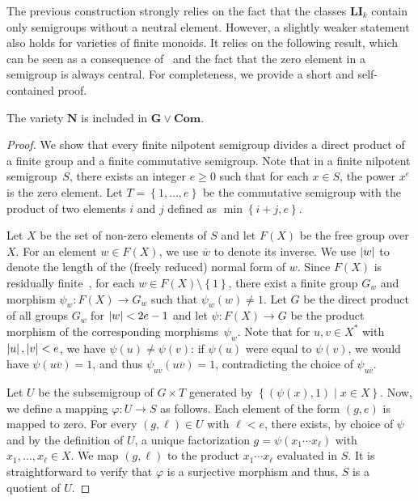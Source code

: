 \documentclass{toc}
\renewcommand{\geq}{\geqslant}
\renewcommand{\ge}{\geq}
\newcommand{\abs}[1]{\ensuremath\left|#1\right|}
\newcommand{\set}[2]{\ensuremath{\left\{#1 \mid #2\right\}}}
\newcommand{\os}[1]{\ensuremath{\left\{#1\right\}}}
\newcommand{\vNil}{\mathbf{N}}
\newcommand{\vLI}{\mathbf{LI}}
\newcommand{\vCom}{\mathbf{Com}}
\newcommand{\vG}{\mathbf{G}}
\begin{document}
The previous construction strongly relies on the fact that the classes $\vLI_k$
contain only semigroups without a neutral element.
%
However, a slightly weaker statement also holds for varieties of finite
monoids.
%
It relies on the following result, which can be seen as a consequence
of~\cite{Almeida88} and the fact that the zero element in a semigroup is always
central.
%
For completeness, we provide a short and self-contained proof.

\begin{proposition}
  The variety $\vNil$ is included in $\vG \lor \vCom$.
\end{proposition}

\begin{proof}
  We show that every finite nilpotent semigroup divides a direct product of a
  finite group and a finite commutative semigroup.
  Note that in a finite nilpotent semigroup~$S$, there exists an integer $e \ge
  0$ such that for each $x \in S$, the power $x^e$ is the zero element.
  Let $T = \os{1, \dots, e}$ be the commutative semigroup with the product of
  two elements $i$ and $j$ defined as $\min\os{i+j,e}$.

  Let $X$ be the set of non-zero elements of $S$ and let $F(X)$ be the free
  group over $X$. For an element $w \in F(X)$, we use $\overline w$ to denote
  its inverse. We use $\abs{w}$ to denote the length of the (freely reduced)
  normal form of $w$.
  Since $F(X)$ is residually finite~\cite{Levi33,LS01}, for each $w \in F(X)
  \setminus \os{1}$, there exist a finite group $G_w$ and morphism $\psi_w
  \colon F(X) \to G_w$ such that $\psi_w(w) \ne 1$.
  Let $G$ be the direct product of all groups $G_w$ for
  $\abs{w} < 2e-1$ and let $\psi \colon F(X) \to G$ be the product morphism
  of the corresponding morphisms~$\psi_w$. Note that for $u, v \in X^*$ with
  $\abs{u}, \abs{v} < e$, we have $\psi(u) \ne \psi(v)$: if $\psi(u)$ were
  equal to $\psi(v)$, we would have $\psi(u \overline v) = 1$, and thus
  $\psi_{u \overline v}(u \overline v) = 1$, contradicting the choice of
  $\psi_{u \overline v}$.

  Let $U$ be the subsemigroup of $G \times T$ generated by $\set{(\psi(x),
  1)}{x \in X}$.
  Now, we define a mapping $\varphi \colon U \to S$ as follows.
  Each element of the form $(g, e)$ is mapped to zero.
  For every $(g, \ell) \in U$ with $\ell < e$, there exists, by choice of
  $\psi$ and by the definition of $U$, a unique factorization $g = \psi(x_1
  \cdots x_\ell)$ with $x_1, \dots, x_\ell \in X$.  We map $(g, \ell)$ to the
  product $x_1 \cdots x_\ell$ evaluated in $S$.
  It is straightforward to verify that $\varphi$ is a surjective morphism and
  thus, $S$ is a quotient of $U$.
\end{proof}
\end{document}
